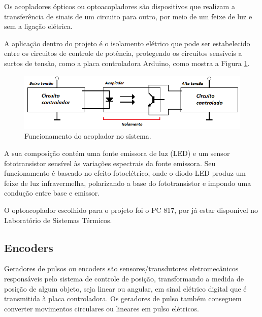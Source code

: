 Os acopladores ópticos ou optoacopladores são dispositivos que realizam a transferência de 
sinais de um circuito para outro, por meio de um feixe de luz e sem a ligação elétrica.

A aplicação dentro do projeto é o isolamento elétrico que pode ser estabelecido entre 
os circuitos de controle de potência, protegendo os circuitos sensíveis a surtos de tensão, 
como a placa controladora Arduino, como mostra a Figura \ref{fig:acoplador}.

\begin{figure}[H]
\centering
\caption{Funcionamento do acoplador no sistema.}\label{fig:acoplador}
\includegraphics[width = 1\linewidth]{figuras/acoplador}
\end{figure}
    
A sua composição contém uma fonte emissora de luz (LED) e um sensor fototransistor sensível às variações 
espectrais da fonte emissora. Seu funcionamento é baseado no efeito fotoelétrico, onde o diodo LED produz 
um feixe de luz infravermelha, polarizando a base do fototransistor e impondo uma condução 
entre base e emissor.

O optoacoplador escolhido para o projeto foi o PC 817, por já estar disponível no Laboratório de Sistemas 
Térmicos.

\subsection{Encoders}\label{subsec:metencoder}

Geradores de pulsos ou encoders são sensores/transdutores eletromecânicos responsáveis pelo sistema de 
controle de posição, transformando a medida de posição de algum objeto, seja linear ou angular, em sinal 
elétrico digital que é transmitida à placa controladora. Os geradores de pulso também conseguem converter 
movimentos circulares ou lineares em pulso elétricos.

